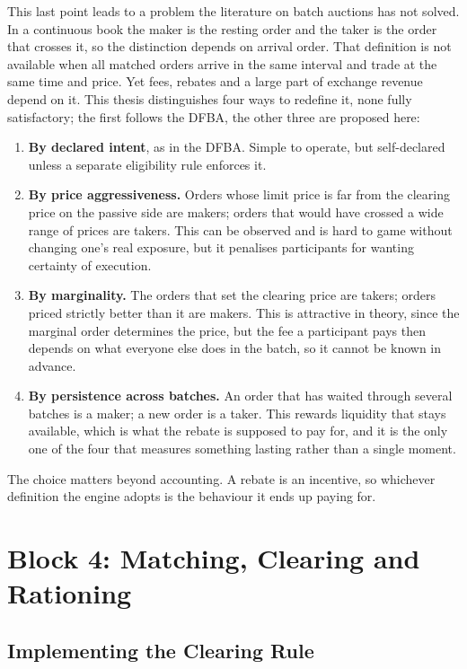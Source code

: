 This last point leads to a problem the literature on batch auctions has not
solved. In a continuous book the maker is the resting order and the taker is
the order that crosses it, so the distinction depends on arrival order. That
definition is not available when all matched orders arrive in the same
interval and trade at the same time and price. Yet fees, rebates and a large
part of exchange revenue depend on it. This thesis distinguishes four ways
to redefine it, none fully satisfactory; the first follows the DFBA, the
other three are proposed here:

\begin{enumerate}
  \item \textbf{By declared intent}, as in the DFBA. Simple to operate, but
  self-declared unless a separate eligibility rule enforces it.
  \item \textbf{By price aggressiveness.} Orders whose limit price is far from
  the clearing price on the passive side are makers; orders that would have
  crossed a wide range of prices are takers. This can be observed and is hard
  to game without changing one's real exposure, but it penalises participants
  for wanting certainty of execution.
  \item \textbf{By marginality.} The orders that set the clearing price are
  takers; orders priced strictly better than it are makers. This is
  attractive in theory, since the marginal order determines the price, but the
  fee a participant pays then depends on what everyone else does in the
  batch, so it cannot be known in advance.
  \item \textbf{By persistence across batches.} An order that has waited
  through several batches is a maker; a new order is a taker. This rewards
  liquidity that stays available, which is what the rebate is supposed to pay
  for, and it is the only one of the four that measures something lasting
  rather than a single moment.
\end{enumerate}

The choice matters beyond accounting. A rebate is an incentive, so whichever
definition the engine adopts is the behaviour it ends up paying for.

\section{Block 4: Matching, Clearing and Rationing}
\label{sec:clearing}

\subsection{Implementing the Clearing Rule}

